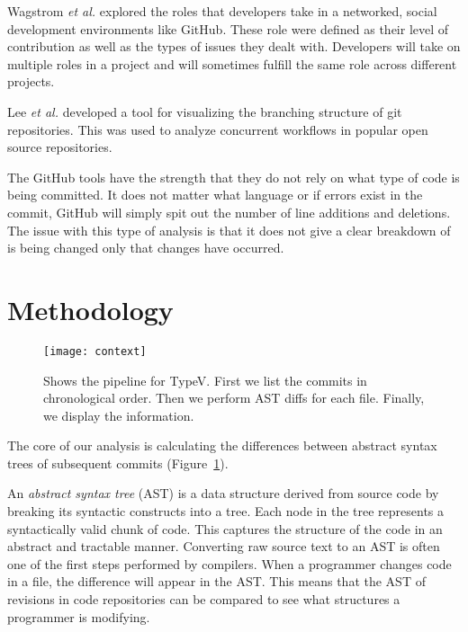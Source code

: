 Wagstrom \textit{et al.} \cite{Patrick:Wagstrom:2012} explored the roles that developers take in a networked, social development environments like GitHub. These role were defined as their level of contribution as well as the types of issues they dealt with. Developers will take on multiple roles in a project and will sometimes fulfill the same role across different projects.

Lee \textit{et al.} \cite{lee2013} developed a tool for visualizing the branching structure of git repositories. This was used to analyze concurrent workflows in popular open source repositories.

The GitHub tools have the strength that they do not rely on what type of code is being committed. It does not matter what language or if errors exist in the commit, GitHub will simply spit out the number of line additions and deletions. The issue with this type of analysis is that it does not give a clear breakdown of is being changed only that changes have occurred.

\section{Methodology}
\label{sec:methodology}

\begin{figure}[!h]
\centering
\texttt{[image: context]}
\caption{Shows the pipeline for TypeV. First we list the commits in chronological order. Then we perform AST diffs for each file. Finally, we display the information.}
\label{fig:context}
\end{figure}

The core of our analysis is calculating the differences between abstract syntax trees of subsequent commits (Figure~\ref{fig:context}).

An \emph{abstract syntax tree} (AST) is a data structure derived from source code by breaking its syntactic constructs into a tree. Each node in the tree represents a syntactically valid chunk of code. This captures the structure of the code in an abstract and tractable manner. Converting raw source text to an AST is often one of the first steps performed by compilers. When a programmer changes code in a file, the difference will appear in the AST. This means that the AST of revisions in code repositories can be compared to see what structures a programmer is modifying.

